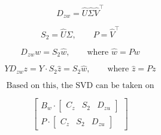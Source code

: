 \documentclass[11pt]{article}
\begin{document}
\[
D_{zw} = \hat U \hat \Sigma \hat V^\top
\]

\[
S_2 = \hat U \hat \Sigma,
\qquad
P = \hat V^\top
\]

\[
D_{zw} w = S_2 \hat w,
\qquad \text{where } \hat w = P w
\]

\[
Y D_{zw} z = Y \cdot S_2 \hat z = S_2 \hat w,
\qquad \text{where } \hat z = P z
\]


\[
\text{Based on this, the SVD can be taken on}
\]

\[
\begin{bmatrix}
B_w \cdot \begin{bmatrix} C_z & S_2 & D_{zu} \end{bmatrix} \\
P \cdot \begin{bmatrix} C_z & S_2 & D_{zu} \end{bmatrix}
\end{bmatrix}
\]
\end{document}
